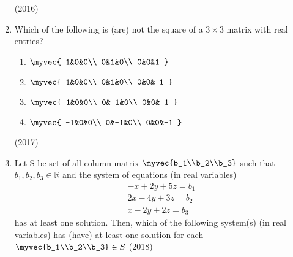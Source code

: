 \begin{enumerate}[label=\thesubsection.\arabic*.,ref=\thesubsection.\theenumi]
\begin{enumerate}
        \end{enumerate}
        \hfill (2016)
    \item 
        Which of the following is (are) not the square of a $3 \times 3$ matrix with real entries?
\begin{multicols}{2}
            \begin{enumerate}
                \itemsep0.4em
                \item 
                    $\myvec{
                        1&0&0\\
                        0&1&0\\
                        0&0&1
                    }$\\
                \item 
                    $\myvec{
                        1&0&0\\
                        0&1&0\\
                        0&0&-1
                    }$\\
                \item 
                    $\myvec{
                        1&0&0\\
                        0&-1&0\\
                        0&0&-1
                    }$\\
                \item 
                    $\myvec{
                        -1&0&0\\
                        0&-1&0\\
                        0&0&-1
                    }$\\
            \end{enumerate}
\end{multicols}
            \hfill (2017)	
\item Let S be set of all column matrix $\myvec{b_1\\b_2\\b_3}$ such that $b_1, b_2, b_3 \in \mathbb{R}$ and the system of equations (in real variables)\begin{align*}-x+2y+5z=b_1\\2x-4y+3z=b_2\\x-2y+2z=b_3\end{align*} has at least one solution. Then, which of the following system(s) (in real variables) has (have) at least one solution for each $\myvec{b_1\\b_2\\b_3}\in S$ \hfill(2018)

\end{enumerate}
